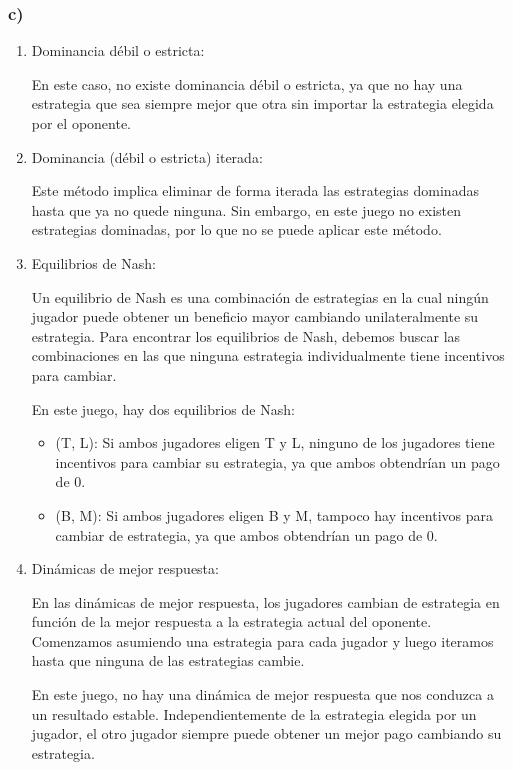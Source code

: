 \documentclass[11pt]{article}
\begin{document}
\subsubsection*{c)}
\begin{enumerate}
    \item Dominancia débil o estricta:
    
    En este caso, no existe dominancia débil o estricta, ya que no hay una estrategia que sea siempre mejor que otra sin importar la estrategia elegida por el oponente.
    
    \item Dominancia (débil o estricta) iterada:
    
    Este método implica eliminar de forma iterada las estrategias dominadas hasta que ya no quede ninguna. Sin embargo, en este juego no existen estrategias dominadas, por lo que no se puede aplicar este método.
    
    \item Equilibrios de Nash:
    
    Un equilibrio de Nash es una combinación de estrategias en la cual ningún jugador puede obtener un beneficio mayor cambiando unilateralmente su estrategia. Para encontrar los equilibrios de Nash, debemos buscar las combinaciones en las que ninguna estrategia individualmente tiene incentivos para cambiar.
    
    En este juego, hay dos equilibrios de Nash:
    \begin{itemize}
    \item (T, L): Si ambos jugadores eligen T y L, ninguno de los jugadores tiene incentivos para cambiar su estrategia, ya que ambos obtendrían un pago de 0.
    \item (B, M): Si ambos jugadores eligen B y M, tampoco hay incentivos para cambiar de estrategia, ya que ambos obtendrían un pago de 0.
    \end{itemize}
    
    \item Dinámicas de mejor respuesta:
    
    En las dinámicas de mejor respuesta, los jugadores cambian de estrategia en función de la mejor respuesta a la estrategia actual del oponente. Comenzamos asumiendo una estrategia para cada jugador y luego iteramos hasta que ninguna de las estrategias cambie.
    
    En este juego, no hay una dinámica de mejor respuesta que nos conduzca a un resultado estable. Independientemente de la estrategia elegida por un jugador, el otro jugador siempre puede obtener un mejor pago cambiando su estrategia.
    

\end{enumerate}
\end{document}
